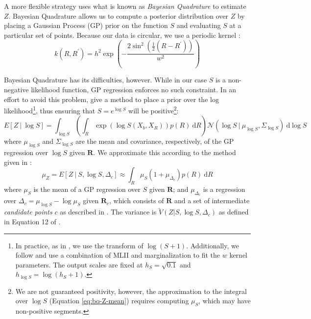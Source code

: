 \documentclass{article} %
\begin{document}
A more flexible strategy uses what is known as \emph{Bayesian
  Quadrature} \cite{Diaconis:1988uo,OHagan:1991tx} to estimate $Z$.
Bayesian Quadrature allows us to compute a posterior distribution over
$Z$ by placing a Gaussian Process (GP) prior on the function $S$ and
evaluating $S$ at a particular set of points. Because our data is
circular, we use a periodic kernel \cite{Rasmussen:2006vz}:
\begin{equation}
k(R, R^\prime)=h^2\exp\left(-\frac{2\sin^2\left(\frac{1}{2}(R-R^\prime)\right)}{w^2}\right)
\end{equation}

Bayesian Quadrature has its difficulties, however. While in our case
$S$ is a non-negative likelihood function, GP regression enforces no
such constraint. In an effort to avoid this problem,
\cite{Osborne:2012tm} give a method to place a prior over the log
likelihood\footnote{In practice, as in \cite{Osborne:2012tm}, we use
  the transform of $\log(S+1)$. Additionally, we follow
  \cite{Osborne:2012tm} and use a combination of MLII and
  marginalization to fit the $w$ kernel parameters. The output scales
  are fixed at $h_S=\sqrt{0.1}$ and $h_{\log S}=\log(h_S + 1)$.}, thus
ensuring that $S=e^{\log S}$ will be positive\footnote{We are not
  guaranteed positivity, however, the approximation to the integral
  over $\log S$ (Equation \ref{eq:bq-Z-mean}) requires computing
  $\mu_S$, which may have non-positive segments.}:
\begin{equation*}
  E[Z\ \vert \ \log S]=\int_{\log S}\left(\int_R \exp(\log{S(X_b,X_R)})p(R)\ \mathrm{d}R\right)\mathcal{N}\left(\log{S}\ \vert \ \mu_{\log S}, \Sigma_{\log S}\right)\ \mathrm{d}\log S
\end{equation*}
where $\mu_{\log S}$ and $\Sigma_{\log S}$ are the mean and
covariance, respectively, of the GP regression over $\log S$ given
$\mathbf{R}$. We approximate this according to the method given in
\cite{Osborne:2012tm}:
\begin{equation}
  \mu_Z=E[Z\ \vert \ S, \log S, \Delta_c] \approx \int_R \mu_{S}(1 + \mu_{\Delta_c}) p(R)\ \mathrm{d}R 
  \label{eq:bq-Z-mean}
\end{equation}
where $\mu_S$ is the mean of a GP regression over $S$ given
$\mathbf{R}$; and $\mu_{\Delta_c}$ is a regression over
$\Delta_c=\mu_{\log S} - \log \mu_S$ given $\mathbf{R}_c$, which
consists of $\mathbf{R}$ and a set of intermediate \emph{candidate
  points} $c$ as described in \cite{Osborne:2012tm}. The variance is
$\tilde{V}(Z\vert S, \log S, \Delta_c)$ as defined in Equation 12 of
\cite{Osborne:2012tm}.
\end{document}
